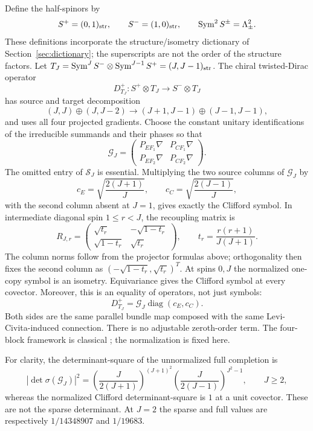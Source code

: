 \documentclass[11pt]{article}
\theoremstyle{definition}
\begin{document}
Define the half-spinors by
\[
 S^+=(0,1)_{\rm str},\qquad S^-=(1,0)_{\rm str},\qquad
 \operatorname{Sym}^2 S^\pm=\Lambda^2_\pm.
\]
These definitions incorporate the structure/isometry dictionary of
Section~\ref{sec:dictionary}; the superscripts are not the order of the
structure factors. Let
$T_J=\operatorname{Sym}^J S^-\otimes\operatorname{Sym}^{J-1}S^+=(J,J-1)_{\rm str}$.
The chiral twisted-Dirac operator
\[
 D^+_{T_J}:S^+\otimes T_J\longrightarrow S^-\otimes T_J
\]
has source and target decomposition
\[
 (J,J)\oplus(J,J-2)
 \longrightarrow
 (J+1,J-1)\oplus(J-1,J-1),
\]
and uses all four projected gradients. Choose the constant unitary
identifications of the irreducible summands and their phases so that
\[
 \mathcal G_J=
 \begin{pmatrix}P_{EF_1}\nabla&P_{CF_1}\nabla\\
 P_{EF_2}\nabla&P_{CF_2}\nabla\end{pmatrix}.
\]
The omitted entry of $\mathcal S_J$ is essential. Multiplying the two
source columns of $\mathcal G_J$ by
\[
 c_E=\sqrt{\frac{2(J+1)}{J}},
 \qquad
 c_C=\sqrt{\frac{2(J-1)}{J}},
\]
with the second column absent at $J=1$, gives exactly the Clifford symbol.
In intermediate diagonal spin $1\leq r<J$, the
recoupling matrix is
\[
 R_{J,r}=
 \begin{pmatrix}
 \sqrt{t_r}&-\sqrt{1-t_r}\\
 \sqrt{1-t_r}&\sqrt{t_r}
 \end{pmatrix},
 \qquad
 t_r=\frac{r(r+1)}{J(J+1)}.
\]
The column norms follow from the projector formulas above; orthogonality
then fixes the second column as $(-\sqrt{1-t_r},\sqrt{t_r})^T$.
At spins $0,J$ the normalized one-copy symbol is an isometry.
Equivariance gives the Clifford symbol at every covector. Moreover, this is
an equality of operators, not just symbols:
\[
 D^+_{T_J}=\mathcal G_J\operatorname{diag}(c_E,c_C).
\]
Both sides are the same parallel bundle map composed with the same
Levi-Civita-induced connection. There is no adjustable zeroth-order term.
The four-block framework is classical
\cite[Sec.~2, Eq.~(2.3)]{HommaTomihisa2021}; the normalization is fixed here.

For clarity, the determinant-square of the unnormalized full completion is
\[
 |\det\sigma(\mathcal G_J)|^2=
 \left(\frac{J}{2(J+1)}\right)^{(J+1)^2}
 \left(\frac{J}{2(J-1)}\right)^{J^2-1},\qquad J\geq2,
\]
whereas the normalized Clifford determinant-square is $1$ at a unit
covector. These are not the sparse determinant. At $J=2$ the sparse and
full values are respectively $1/14348907$ and $1/19683$.
\end{document}
